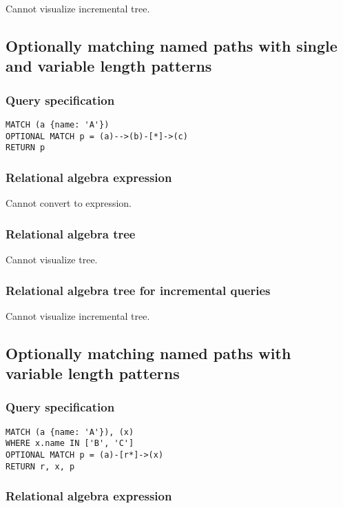 Cannot visualize incremental tree.

\subsection{Optionally matching named paths with single and variable length patterns}

\subsubsection*{Query specification}

\begin{lstlisting}
MATCH (a {name: 'A'})
OPTIONAL MATCH p = (a)-->(b)-[*]->(c)
RETURN p
\end{lstlisting}

\subsubsection*{Relational algebra expression}

Cannot convert to expression.

\subsubsection*{Relational algebra tree}

Cannot visualize tree.

\subsubsection*{Relational algebra tree for incremental queries}

Cannot visualize incremental tree.

\subsection{Optionally matching named paths with variable length patterns}

\subsubsection*{Query specification}

\begin{lstlisting}
MATCH (a {name: 'A'}), (x)
WHERE x.name IN ['B', 'C']
OPTIONAL MATCH p = (a)-[r*]->(x)
RETURN r, x, p
\end{lstlisting}

\subsubsection*{Relational algebra expression}

